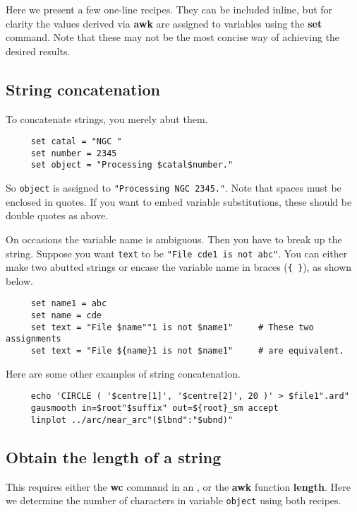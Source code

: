 Here we present a few one-line recipes.  They can be included inline,
but for clarity the values derived via {\bf awk} are assigned to
variables using the {\bf set} command.  Note that these may not be the
most concise way of achieving the desired results.

\subsection{String concatenation
\label{sc4_se_string_conc}}

To concatenate strings, you merely abut them.

\small
\begin{verbatim}
     set catal = "NGC "
     set number = 2345
     set object = "Processing $catal$number."
\end{verbatim}
\normalsize
So {\tt object} is assigned to {\tt "Processing NGC 2345."}.
Note that spaces must be enclosed in quotes.  If you want to embed
variable substitutions, these should be double quotes as above.

On occasions the variable name is ambiguous.  Then you have to break up
the string.  Suppose you want {\tt text} to be {\tt "File cde1 is not
abc"}.  You can either make two abutted strings or encase the variable
name in braces (\verb+{+~\verb+}+), as shown below.

\small
\begin{verbatim}
     set name1 = abc
     set name = cde
     set text = "File $name""1 is not $name1"     # These two assignments
     set text = "File ${name}1 is not $name1"     # are equivalent.
\end{verbatim}
\normalsize

Here are some other examples of string concatenation.

\small
\begin{verbatim}
     echo 'CIRCLE ( '$centre[1]', '$centre[2]', 20 )' > $file1".ard"
     gausmooth in=$root"$suffix" out=${root}_sm accept
     linplot ../arc/near_arc"($lbnd":"$ubnd)"
\end{verbatim}
\normalsize

\newpage
\subsection{Obtain the length of a string
\label{sc4_se_string_length}}

This requires either the {\bf wc} command in an
, or the {\bf awk} function {\bf length}.
Here we determine the number of characters
in variable {\tt object} using both recipes.

